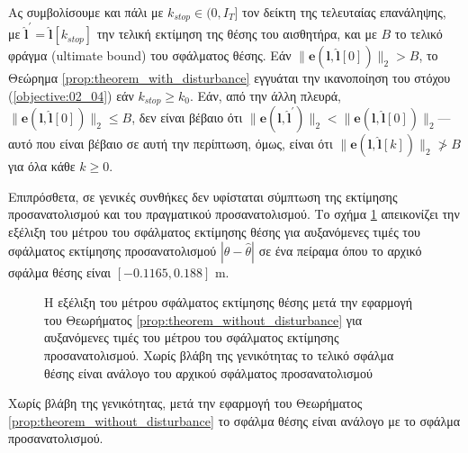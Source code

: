 Ας συμβολίσουμε και πάλι με $k_{stop} \in (0, I_T]$ τον δείκτη της τελευταίας
επανάληψης, με $\hat{\bm{l}}^{\prime} = \hat{\bm{l}}[k_{stop}]$ την τελική
εκτίμηση της θέσης του αισθητήρα, και με $B$ το τελικό φράγμα (ultimate bound)
του σφάλματος θέσης. Εάν $\|\bm{e}(\bm{l}, \hat{\bm{l}}[0])\|_2 > B$, το
Θεώρημα \ref{prop:theorem_with_disturbance} εγγυάται την ικανοποίηση του στόχου
(\ref{objective:02_04}) εάν $k_{stop} \geq k_0$. Εάν, από την άλλη πλευρά,
$\|\bm{e}(\bm{l}, \hat{\bm{l}}[0])\|_2 \leq B$, δεν είναι βέβαιο ότι
$\|\bm{e}(\bm{l}, \hat{\bm{l}}^{\prime})\|_2 < \|\bm{e}(\bm{l},
\hat{\bm{l}}[0])\|_2$---αυτό που είναι βέβαιο σε αυτή την περίπτωση, όμως,
είναι ότι $\|\bm{e}(\bm{l}, \hat{\bm{l}}[k])\|_2 \ngtr B$ για όλα κάθε $k \geq
0$.

Επιπρόσθετα, σε γενικές συνθήκες δεν υφίσταται σύμπτωση της εκτίμησης
προσανατολισμού και του πραγματικού προσανατολισμού.  Το σχήμα
\ref{fig:02_04_03:tc_x1_non_convergence} απεικονίζει την εξέλιξη του μέτρου του
σφάλματος εκτίμησης θέσης για αυξανόμενες τιμές του σφάλματος εκτίμησης
προσανατολισμού $|\theta - \hat{\theta}|$ σε ένα πείραμα όπου το αρχικό σφάλμα
θέσης είναι $[-0.1165, 0.188]$ m.

\begin{figure}[!h]\centering
  
  \caption{\small Η εξέλιξη του μέτρου σφάλματος εκτίμησης θέσης μετά την
           εφαρμογή του Θεωρήματος \ref{prop:theorem_without_disturbance} για
           αυξανόμενες τιμές του μέτρου του σφάλματος εκτίμησης
           προσανατολισμού. Χωρίς βλάβη της γενικότητας το τελικό σφάλμα θέσης
           είναι ανάλογο του αρχικού σφάλματος προσανατολισμού}
  \label{fig:02_04_03:tc_x1_non_convergence}
\end{figure}

\begin{gg_box}
\begin{remark}
  \label{remark:loc_prop_or}
  Χωρίς βλάβη της γενικότητας, μετά την εφαρμογή του Θεωρήματος
  \ref{prop:theorem_without_disturbance} το σφάλμα θέσης είναι ανάλογο με το
  σφάλμα προσανατολισμού.
\end{remark}
\end{gg_box}

